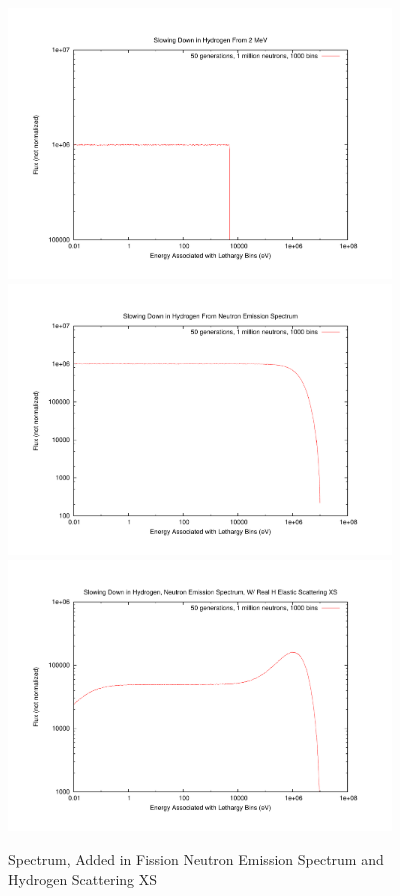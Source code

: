 \documentclass{school-22.211-notes}
\begin{document}
\begin{figure}[ht]
  \centering
  \includegraphics[width=4in]{images/sl-d/spec-1.uncrop.pdf}
  \\
  \includegraphics[width=4in]{images/sl-d/spec-2.uncrop.pdf}
  \\
  \includegraphics[width=4in]{images/sl-d/spec-3.uncrop.pdf}
  \caption{Spectrum, Added in Fission Neutron Emission Spectrum and Hydrogen Scattering XS} \label{spe1}
\end{figure}
\end{document}
